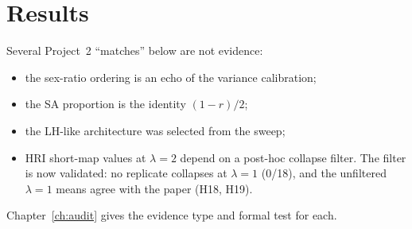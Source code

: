 \chapter{Results}\label{ch:results}

\begin{warnbox}
Several Project~2 ``matches'' below are not evidence:
\begin{itemize}
\item the sex-ratio ordering is an echo of the variance calibration;
\item the SA proportion is the identity $(1-r)/2$;
\item the LH-like architecture was selected from the sweep;
\item HRI short-map values at $\lambda=2$ depend on a post-hoc collapse filter. The filter is now validated: no replicate collapses at $\lambda=1$ (0/18), and the unfiltered $\lambda=1$ means agree with the paper (H18, H19).
\end{itemize}
Chapter~\ref{ch:audit} gives the evidence type and formal test for each.
\end{warnbox}

